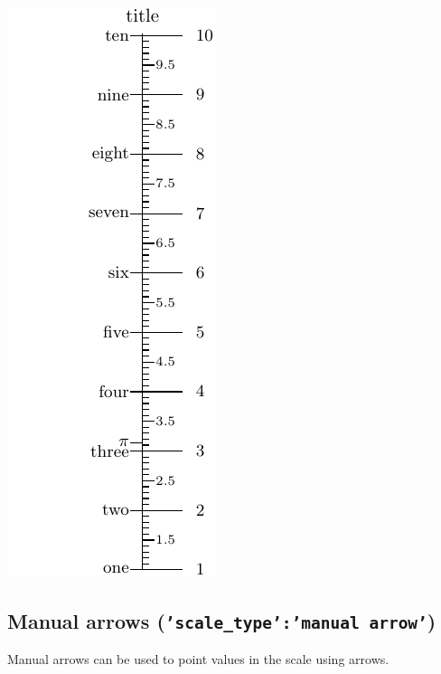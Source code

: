\documentclass[a4paper,11pt,english]{sphinxmanual}
\begin{document}
\includegraphics{ex_axes_7.pdf}


\subsection{Manual arrows  (\texttt{'scale\_type':'manual arrow'})}
\label{axes/axes:manual-arrows-scale-type-manual-arrow}
Manual arrows can be used to point values in the scale using arrows.
\end{document}

